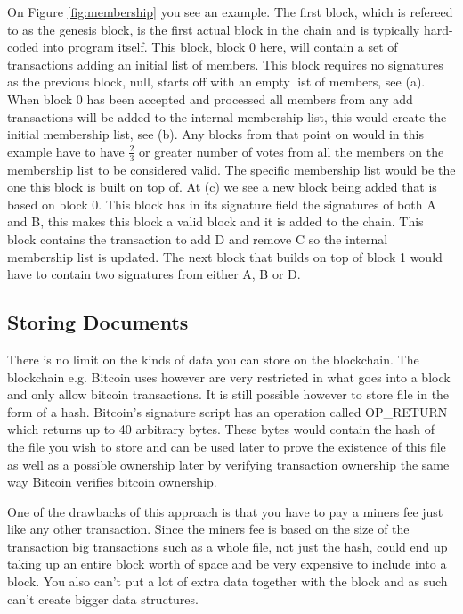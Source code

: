 \documentclass[11pt]{article}
\begin{document}
On Figure \ref{fig:membership} you see an example. The first block, which is refereed to as the genesis block, is the first actual block in the chain and is typically hard-coded into program itself. This block, block 0 here, will contain a set of transactions adding an initial list of members. This block requires no signatures as the previous block, null, starts off with an empty list of members, see (a). When block 0 has been accepted and processed all members from any add transactions will be added to the internal membership list, this would create the initial membership list, see (b). Any blocks from that point on would in this example have to have $\frac{2}{3}$ or greater number of votes from all the members on the membership list to be considered valid. The specific membership list would be the one this block is built on top of. At (c) we see a new block being added that is based on block 0. This block has in its signature field the signatures of both A and B, this makes this block a valid block and it is added to the chain. This block contains the transaction to add D and remove C so the internal membership list is updated. The next block that builds on top of block 1 would have to contain two signatures from either A, B or D.

\subsection{Storing Documents}

There is no limit on the kinds of data you can store on the blockchain. The blockchain e.g. Bitcoin uses however are very restricted in what goes into a block and only allow bitcoin transactions. It is still possible however to store file in the form of a hash. Bitcoin's signature script has an operation called OP\_RETURN which returns up to 40 arbitrary bytes. These bytes would contain the hash of the file you wish to store and can be used later to prove the existence of this file as well as a possible ownership later by verifying transaction ownership the same way Bitcoin verifies bitcoin ownership.

One of the drawbacks of this approach is that you have to pay a miners fee just like any other transaction. Since the miners fee is based on the size of the transaction big transactions such as a whole file, not just the hash, could end up taking up an entire block worth of space and be very expensive to include into a block. You also can't put a lot of extra data together with the block and as such can't create bigger data structures.
\end{document}
